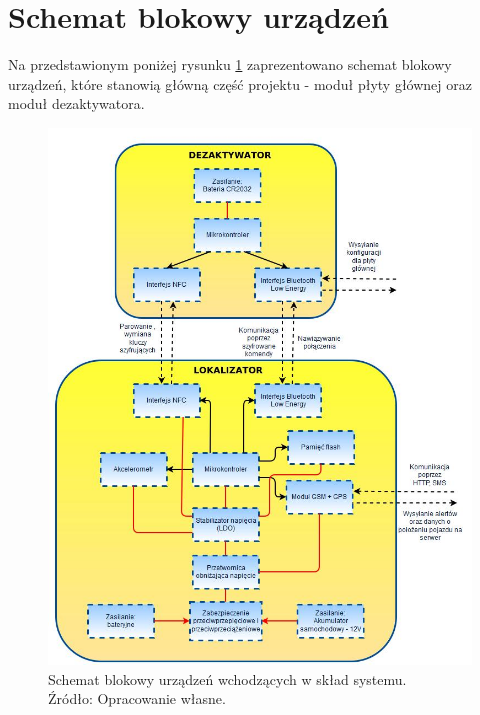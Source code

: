 \section{Schemat blokowy urządzeń}
\label{Schemat_blokowy_urządzen}
Na przedstawionym poniżej rysunku \ref{fig:image_device_block_diagram} zaprezentowano schemat blokowy urządzeń, które stanowią główną część projektu - moduł płyty głównej oraz moduł dezaktywatora. 

\begin{figure}[h]
	\centering
	\includegraphics[width=13cm]{img/introduction/device_block_diagram.jpg}
	\caption{Schemat blokowy urządzeń wchodzących w skład systemu. \\ Źródło: Opracowanie własne.}
	\label{fig:image_device_block_diagram}
\end{figure}
	
	
